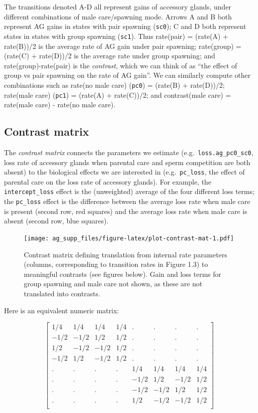 \documentclass[
]{article}
\begin{document}
The transitions denoted A-D all represent gains of accessory glands,
under different combinations of male care/spawning mode. Arrows A and B
both represent AG gains in states with pair spawning (\texttt{sc0}); C
and D both represent states in states with group spawning
(\texttt{sc1}). Thus rate(pair) = (rate(A) + rate(B))/2 is the average
rate of AG gain under pair spawning; rate(group) = (rate(C) + rate(D))/2
is the average rate under group spawning; and rate(group)-rate(pair) is
the \emph{contrast}, which we can think of as ``the effect of group vs
pair spawning on the rate of AG gain''. We can similarly compute other
combinations such as rate(no male care) (\texttt{pc0}) = (rate(B) +
rate(D))/2; rate(male care) (\texttt{pc1}) = (rate(A) + rate(C))/2; and
contrast(male care) = rate(male care) - rate(no male care).

\hypertarget{contrast-matrix}{%
\subsection{Contrast matrix}\label{contrast-matrix}}

The \emph{contrast matrix} connects the parameters we estimate
(e.g.~\texttt{loss.ag\_pc0\_sc0}, loss rate of accessory glands when
parental care and sperm competition are both absent) to the biological
effects we are interested in (e.g.~\texttt{pc\_loss}, the effect of
parental care on the loss rate of accessory glands). For example, the
\texttt{intercept\_loss} effect is the (unweighted) average of the four
different loss terms; the \texttt{pc\_loss} effect is the difference
between the average loss rate when male care is present (second row, red
squares) and the average loss rate when male care is absent (second row,
blue squares).

\begin{figure}
\centering
\texttt{[image: ag\_supp\_files/figure-latex/plot-contrast-mat-1.pdf]}
\caption{Contrast matrix defining translation from internal rate
parameters (columns, corresponding to transition rates in Figure 1.3) to
meaningful contrasts (see figures below). Gain and loss terms for group
spawning and male care not shown, as these are not translated into
contrasts.}
\end{figure}

Here is an equivalent numeric matrix:

\[
\left[
\begin{array}{rrrrrrrr}
1/4 & 1/4 & 1/4 & 1/4 & . & . & . & . \\
-1/2 & -1/2 & 1/2 & 1/2 & . & . & . & . \\
1/2 & -1/2 & -1/2 & 1/2 & . & . & . & . \\
-1/2 & 1/2 & -1/2 & 1/2 & . & . & . & . \\
. & . & . & . & 1/4 & 1/4 & 1/4 & 1/4 \\
. & . & . & . & -1/2 & 1/2 & -1/2 & 1/2 \\
. & . & . & . & -1/2 & -1/2 & 1/2 & 1/2 \\
. & . & . & . & 1/2 & -1/2 & -1/2 & 1/2 \\
\end{array}
\right]
\]
\end{document}
